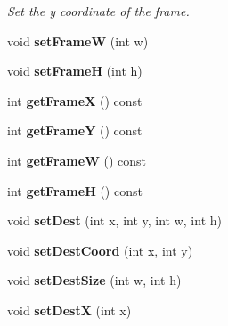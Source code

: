 \begin{DoxyCompactItemize}
\begin{DoxyCompactList}\small\item\em Set the y coordinate of the frame. \end{DoxyCompactList}\item 
void {\bfseries set\+FrameW} (int w)\hypertarget{classObject_a006f2d1cb18c9584436a0eda2d96c567}{}\label{classObject_a006f2d1cb18c9584436a0eda2d96c567}

\item 
void {\bfseries set\+FrameH} (int h)\hypertarget{classObject_add78987ddbf11953b68fc345a8795fe6}{}\label{classObject_add78987ddbf11953b68fc345a8795fe6}

\item 
int {\bfseries get\+FrameX} () const \hypertarget{classObject_ad20624ea370509e0666e9e16faec6d7b}{}\label{classObject_ad20624ea370509e0666e9e16faec6d7b}

\item 
int {\bfseries get\+FrameY} () const \hypertarget{classObject_aa4bfe9ff7f18972dc81e5e21cf5a090a}{}\label{classObject_aa4bfe9ff7f18972dc81e5e21cf5a090a}

\item 
int {\bfseries get\+FrameW} () const \hypertarget{classObject_a15fb56faeb164637a580ccea7791217d}{}\label{classObject_a15fb56faeb164637a580ccea7791217d}

\item 
int {\bfseries get\+FrameH} () const \hypertarget{classObject_a3e660243bcb095e1fdd1d0b65ea4f861}{}\label{classObject_a3e660243bcb095e1fdd1d0b65ea4f861}

\item 
void {\bfseries set\+Dest} (int x, int y, int w, int h)\hypertarget{classObject_ad84b0509560185fb9c67d7bbddab4c97}{}\label{classObject_ad84b0509560185fb9c67d7bbddab4c97}

\item 
void {\bfseries set\+Dest\+Coord} (int x, int y)\hypertarget{classObject_a2d8ce90ca6298a66a3a7f59d2d6b65c9}{}\label{classObject_a2d8ce90ca6298a66a3a7f59d2d6b65c9}

\item 
void {\bfseries set\+Dest\+Size} (int w, int h)\hypertarget{classObject_a1f84fcc4360d4bc47583ec27833f1364}{}\label{classObject_a1f84fcc4360d4bc47583ec27833f1364}

\item 
void {\bfseries set\+DestX} (int x)\hypertarget{classObject_a2757f4694225b4d7aba36613ec775a24}{}\label{classObject_a2757f4694225b4d7aba36613ec775a24}


\end{DoxyCompactItemize}
